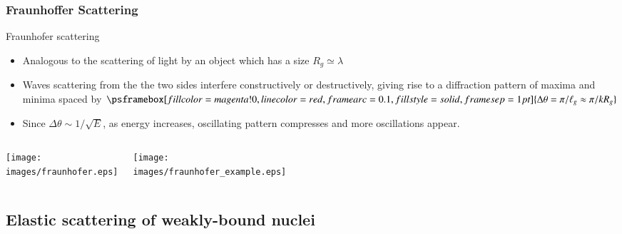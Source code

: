 \documentclass[english,10pt]{beamer}
\newcommand{\bi}{\begin{itemize}}
\newcommand{\ei}{\end{itemize}}
\newcommand{\images}{images}
\begin{document}


\subsubsection{Fraunhoffer Scattering}

\begin{frame}[fragile]{Fraunhofer scattering}

{\small 

\bi

\item Analogous to the scattering of light by an object which has a size $R_g \simeq \lambda$

\item Waves scattering from the the two sides  interfere constructively or destructively, giving rise to a diffraction pattern of maxima and minima spaced by 
$
\psframebox[fillcolor=magenta!0,linecolor=red,framearc=0.1,fillstyle=solid,framesep=1pt]{
\Delta \theta= \pi /\ell_g \approx \pi/ k R_g
}
$
\item Since $\Delta \theta \sim 1/\sqrt{E}$, as energy increases, oscillating pattern compresses and more oscillations appear.
\ei

}

\begin{columns}
\begin{center}
    \texttt{[image: \\images/fraunhofer.eps]}
\end{center}
\begin{center}
    \texttt{[image: \\images/fraunhofer\_example.eps]}
\end{center}
\end{columns}



\end{frame}





\subsection{Elastic scattering of weakly-bound nuclei}
\end{document}
